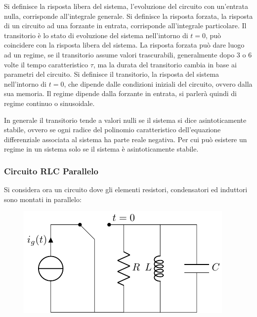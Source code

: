 \documentclass{article}
\numberwithin{equation}{subsection}
\begin{document}
Si definisce la risposta libera del sistema, l'evoluzione del circuito con un'entrata nulla, corrisponde all'integrale generale.  
Si definisce la risposta forzata, la risposta di un circuito ad una forzante in entrata, corrisponde all'integrale particolare. 
Il transitorio è lo stato di evoluzione del sistema nell'intorno di $t=0$, può coincidere con la risposta libera del sistema. 
La risposta forzata può dare luogo ad un regime, se il transitorio assume valori trascurabili, generalmente dopo $3$ o $6$ volte il tempo caratteristico $\tau$, 
ma la durata del transitorio cambia in base ai parametri del circuito. 
Si definisce il transitorio, la risposta del sistema nell'intorno di $t=0$, che 
dipende dalle condizioni iniziali del circuito, ovvero dalla sua memoria. Il regime dipende dalla forzante in entrata, si parlerà quindi di regime continuo o sinusoidale. 

In generale il transitorio tende a valori nulli se il sistema si dice asintoticamente stabile, ovvero se ogni radice del polinomio caratteristico dell'equazione 
differenziale associata al sistema ha parte reale negativa. Per cui può esistere un regime in un sistema solo se il sistema è asintoticamente stabile. 

\subsubsection{Circuito RLC Parallelo}

Si considera ora un circuito dove gli elementi resistori, condensatori ed induttori sono montati in parallelo: 
\begin{figure}[H]%
    \centering
    \includegraphics{circuito-rlc-parallelo.pdf}%
    \label{fig:circuito-rlc-parallelo}
\end{figure}
\end{document}
